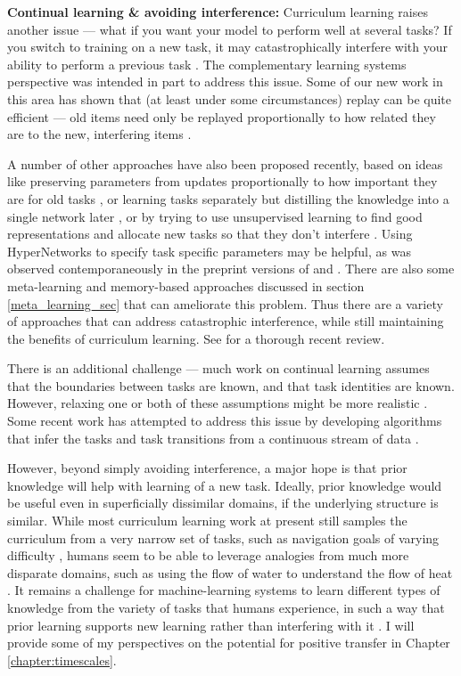 \textbf{Continual learning \& avoiding interference:} Curriculum learning raises another issue --- what if you want your model to perform well at several tasks? If you switch to training on a new task, it may catastrophically interfere with your ability to perform a previous task \citep{McCloskey1989}. The complementary learning systems perspective \citep{McClelland1995, Kumaran2016} was intended in part to address this issue. Some of our new work in this area has shown that (at least under some circumstances) replay can be quite efficient --- old items need only be replayed proportionally to how related they are to the new, interfering items \citep{McClelland2020}. \par
A number of other approaches have also been proposed recently, based on ideas like preserving parameters from updates proportionally to how important they are for old tasks \citep{Kirkpatrick2016, Zenke2017}, or learning tasks separately but distilling the knowledge into a single network later \citep{Rusu2015}, or by trying to use unsupervised learning to find good representations and allocate new tasks so that they don't interfere \citep{Achille2018a, Rao2019}. Using HyperNetworks \citep{Ha2016} to specify task specific parameters may be helpful, as was observed contemporaneously in the preprint versions of \citet{Lampinen2019a} and \citet{Oswald2020}. There are also some meta-learning and memory-based approaches discussed in section \ref{meta_learning_sec} that can ameliorate this problem. Thus there are a variety of approaches that can address catastrophic interference, while still maintaining the benefits of curriculum learning. See \citet{Parisi2019} for a thorough recent review. \par
There is an additional challenge --- much work on continual learning assumes that the boundaries between tasks are known, and that task identities are known. However, relaxing one or both of these assumptions might be more realistic \citep{Ven2018}. Some recent work has attempted to address this issue by developing algorithms that infer the tasks and task transitions from a continuous stream of data \citep{Nagabandi2019}. \par
However, beyond simply avoiding interference, a major hope is that prior knowledge will help with learning of a new task. Ideally, prior knowledge would be useful even in superficially dissimilar domains, if the underlying structure is similar. While most curriculum learning work at present still samples the curriculum from a very narrow set of tasks, such as navigation goals of varying difficulty \citep{Florensa2018}, humans seem to be able to leverage analogies from much more disparate domains, such as using the flow of water to understand the flow of heat \citep[see][]{Falkenhainer1989}. It remains a challenge for machine-learning systems to learn different types of knowledge from the variety of tasks that humans experience, in such a way that prior learning supports new learning rather than interfering with it \citep{Mitchell2018}. I will provide some of my perspectives on the potential for positive transfer in Chapter \ref{chapter:timescales}. \par 


